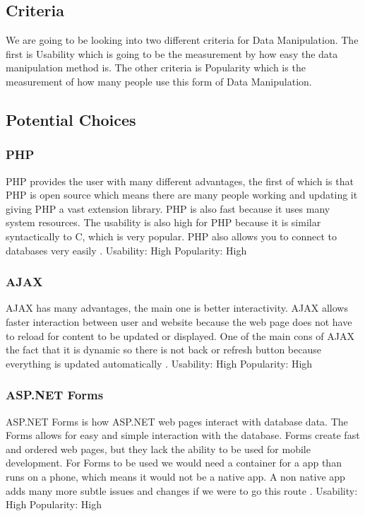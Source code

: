 \documentclass[compsoc, 10, draftclsnofoot, onecolumn]{IEEEtran}
\begin{document}
\subsection{Criteria} We are going to be looking into two different criteria for Data Manipulation. The first is Usability which is going to be the measurement by how easy the data manipulation method is. The other criteria is Popularity which is the measurement of how many people use this form of Data Manipulation.
\subsection{Potential Choices}
\subsubsection{PHP}PHP provides the user with many different advantages, the first of which is that PHP is open source which means there are many people working and updating it giving PHP a vast extension library. PHP is also fast because it uses many system resources. The usability is also high for PHP because it is similar syntactically to C, which is very popular. PHP also allows you to connect to databases very easily \cite{r7}.
\newline
Usability: High
\newline
Popularity: High
\newline
\newline
\subsubsection{AJAX} AJAX has many advantages, the main one is better interactivity. AJAX allows faster interaction between user and website because the web page does not have to reload for content to be updated or displayed. One of the main cons of AJAX the fact that it is dynamic so there is not back or refresh button because everything is updated automatically \cite{r8}.
\newline
Usability: High
\newline
Popularity: High
\newline
\newline
\subsubsection{ASP.NET Forms} ASP.NET Forms is how ASP.NET web pages interact with database data. The Forms allows for easy and simple interaction with the database. Forms create fast and ordered web pages, but they lack the ability to be used for mobile development. For Forms to be used we would need a container for a app than runs on a phone, which means it would not be a native app. A non native app adds many more subtle issues and changes if we were to go this route \cite{r9}.   
\newline
Usability: High
\newline
Popularity: High
\newline
\newline
\end{document}

